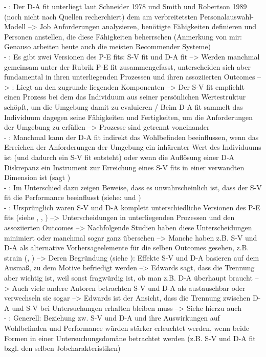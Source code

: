 - \cite[S. 3]{edwards:1990}: Der D-A fit unterliegt laut Schneider 1978 und Smith und Robertson 1989 (noch nicht nach Quellen recherchiert) dem am verbreitetsten Personalauswahl-Modell --> Job Anforderungen analysieren, benötigte Fähigkeiten definieren und Personen anstellen, die diese Fähigkeiten beherrschen (Anmerkung von mir: Genauso arbeiten heute auch die meisten Recommender Systeme) \\
- \cite[S. 3f.]{edwards:1990}: Es gibt zwei Versionen des P-E fits: S-V fit und D-A fit --> Werden manchmal gemeinsam unter der Rubrik P-E fit zusammengefasst, unterscheiden sich aber fundamental in ihren unterliegenden Prozessen und ihren assoziierten Outcomes --> \cite[S. 4]{edwards:1990}: Liegt an den zugrunde liegenden Komponenten --> Der S-V fit empfiehlt einen Prozess bei dem das Individuum aus seiner persönlichen Wertestruktur schöpft, um die Umgebung damit zu evaluieren / Beim D-A fit sammelt das Individuum dagegen seine Fähigkeiten und Fertigkeiten, um die Anforderungen der Umgebung zu erfüllen --> Prozesse sind getrennt voneinander \\
- \cite[S. 4]{edwards:1990}: Manchmal kann der D-A fit indirekt das Wohlbefinden beeinflussen, wenn das Erreichen der Anforderungen der Umgebung ein inhärenter Wert des Individuums ist (und dadurch ein S-V fit entsteht) oder wenn die Auflösung einer D-A Diskrepanz ein Instrument zur Erreichung eines S-V fits in einer verwandten Dimension ist (sagt \textcite{mechanismsOfJobStressAndStrain:1982}) \\
- \cite[S. 4]{edwards:1990}: Im Unterschied dazu zeigen Beweise, dass es unwahrscheinlich ist, dass der S-V fit die Performance beeinflusst (siehe: \textcite{greene:1972} und \textcite{schwabCummings:1970}) \\
- \cite[S. 4]{edwards:1990}: Ursprünglich waren S-V und D-A komplett unterschiedliche Versionen des P-E fits (siehe \textcite{copingAndAdaption:1974}, \textcite{mechanismsOfJobStressAndStrain:1982}, \textcite{harrison:1978}) --> Unterscheidungen in unterliegenden Prozessen und den assoziierten Outcomes --> Nachfolgende Studien haben diese Unterscheidungen minimiert oder manchmal sogar ganz übersehen --> Manche haben z.B. S-V und D-A als alternative Vorhersageelemente für die selben Outcomes gesehen, z.B. strain (\textcite{jobDemandsAndWorkerHealth:1975}, \textcite{mechanismsOfJobStressAndStrain:1982}) --> Deren Begründung (siehe \textcite[S. 31]{mechanismsOfJobStressAndStrain:1982}): Effekte S-V und D-A basieren auf dem Ausmaß, zu dem Motive befriedigt werden --> Edwards sagt, dass die Trennung aber wichtig ist, weil sonst fragwürdig ist, ob man z.B. D-A überhaupt braucht --> Auch viele andere Autoren betrachten S-V und D-A als austauschbar oder verwechseln sie sogar  --> Edwards ist der Ansicht, dass die Trennung zwischen D-A und S-V bei Untersuchungen erhalten bleiben muss --> Siehe hierzu auch \textcite{mechanismsOfJobStressAndStrain:1982} \\
- \cite[S. 5]{edwards:1990}: Generell: Beziehung zw. S-V und D-A und ihre Auswirkungen auf Wohlbefinden und Performance würden stärker erleuchtet werden, wenn beide Formen in einer Untersuchungsdomäne betrachtet werden (z.B. S-V und D-A fit bzgl. den selben Jobcharakteristiken) \textcite{caplan:1987}


